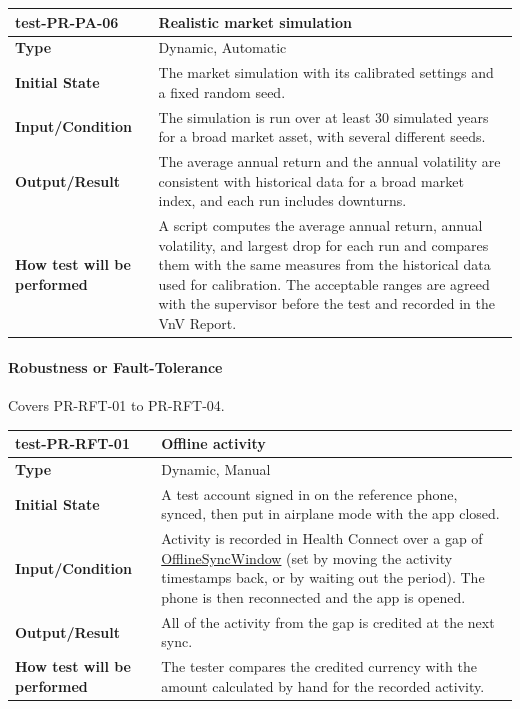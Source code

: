 \documentclass[12pt, titlepage]{article}
\newcommand{\const}[1]{\hyperlink{const:#1}{\textsf{#1}}}
\begin{document}
\noindent\begin{tabularx}{\textwidth}{>{\raggedright\arraybackslash}p{3.5cm}X}
  \toprule
  \textbf{test-PR-PA-06} & \textbf{Realistic market simulation}\\
  \midrule
  \textbf{Type} & Dynamic, Automatic\\
  \textbf{Initial State} & The market simulation with its calibrated settings and a fixed random seed.\\
  \textbf{Input/Condition} & The simulation is run over at least 30 simulated years for a broad market asset, with several different seeds.\\
  \textbf{Output/Result} & The average annual return and the annual volatility are consistent with historical data for a broad market index, and each run includes downturns.\\
  \textbf{How test will be performed} & A script computes the average annual return, annual volatility, and largest drop for each run and compares them with the same measures from the historical data used for calibration. The acceptable ranges are agreed with the supervisor before the test and recorded in the VnV Report.\\
  \bottomrule
\end{tabularx}

\paragraph{Robustness or Fault-Tolerance}

Covers PR-RFT-01 to PR-RFT-04.

\noindent\begin{tabularx}{\textwidth}{>{\raggedright\arraybackslash}p{3.5cm}X}
  \toprule
  \textbf{test-PR-RFT-01} & \textbf{Offline activity}\\
  \midrule
  \textbf{Type} & Dynamic, Manual\\
  \textbf{Initial State} & A test account signed in on the reference phone, synced, then put in airplane mode with the app closed.\\
  \textbf{Input/Condition} & Activity is recorded in Health Connect over a gap of \const{OfflineSyncWindow} (set by moving the activity timestamps back, or by waiting out the period). The phone is then reconnected and the app is opened.\\
  \textbf{Output/Result} & All of the activity from the gap is credited at the next sync.\\
  \textbf{How test will be performed} & The tester compares the credited currency with the amount calculated by hand for the recorded activity.\\
  \bottomrule
\end{tabularx}
\end{document}
